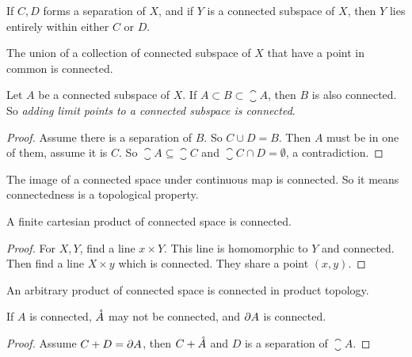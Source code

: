 \begin{theorem}
    If $C,D$ forms a separation of $X$, and if $Y$ is a connected subspace of $X$, then $Y$ lies entirely within either $C$ or $D$.
\end{theorem}

\begin{theorem}
The union of a collection of connected subspace of $X$ that have a point in common is connected.    
\end{theorem}

\begin{theorem}\label{closure_is_connected_too}
    Let $A$ be a connected subspace of $X$. If $A \subset B \subset \closure{A}$, then $B$ is also connected. So \emph{adding limit points to a connected subspace is connected}.
\end{theorem}
\begin{proof}
    Assume there is a separation of $B$. So $C \cup D = B$. Then $A$ must be in one of them, assume it is $C$. So $\closure{A} \subseteq \closure{C}$ and $\closure{C} \cap D = \emptyset$, a contradiction.
\end{proof}

\begin{theorem}\label{cont_func_from_cont_to_cont}
The image of a connected space under continuous map is connected. So it means connectedness is a topological property.
\end{theorem}

\begin{theorem}
A finite cartesian product of connected space is connected.
\end{theorem}
\begin{proof}
For $X,Y$, find a line $x \times Y$. This line is homomorphic to $Y$ and connected. Then find a line $X \times y$ which is connected. They share a point $(x,y)$.
\end{proof}

\begin{theorem}
    An arbitrary product of connected space is connected in product topology.    
\end{theorem}

\begin{example}
    If $A$ is connected, $\mathring{A}$ may not be connected, and $\partial A$ is connected.
\end{example}
\begin{proof}
    Assume $C+D = \partial A$, then $C+ \mathring{A}$ and $D$ is a separation of $\closure{A}$.
\end{proof}


